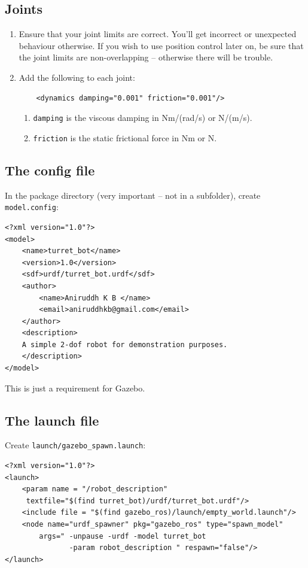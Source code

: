 \documentclass{article}
\begin{document}
        \subsection{Joints}
            \begin{enumerate}
                \item Ensure that your joint limits are correct. You'll get incorrect or unexpected behaviour otherwise. 
                If you wish to use position control later on, be sure that the joint limits are non-overlapping -- otherwise there 
                will be trouble.
                \item Add the following to each joint:
                \begin{verbatim}
    <dynamics damping="0.001" friction="0.001"/>
                \end{verbatim}
                \begin{enumerate}
                    \item \texttt{damping} is the viscous damping in Nm/(rad/s) or N/(m/s).
                    \item \texttt{friction} is the static frictional force in Nm or N.
                \end{enumerate}
            \end{enumerate}
        \newpage
        \subsection{The config file}
            In the package directory (very important -- not in a subfolder), create \texttt{model.config}:
            \begin{verbatim}
<?xml version="1.0"?>
<model>
    <name>turret_bot</name>
    <version>1.0</version>
    <sdf>urdf/turret_bot.urdf</sdf>
    <author>
        <name>Aniruddh K B </name>
        <email>aniruddhkb@gmail.com</email>
    </author>
    <description>
    A simple 2-dof robot for demonstration purposes.
    </description>
</model>          
            \end{verbatim}
            This is just a requirement for Gazebo.
        \subsection{The launch file}
            Create \texttt{launch/gazebo\_spawn.launch}:
            \begin{verbatim}
<?xml version="1.0"?>
<launch>
    <param name = "/robot_description" 
     textfile="$(find turret_bot)/urdf/turret_bot.urdf"/>
    <include file = "$(find gazebo_ros)/launch/empty_world.launch"/>
    <node name="urdf_spawner" pkg="gazebo_ros" type="spawn_model"
        args=" -unpause -urdf -model turret_bot 
               -param robot_description " respawn="false"/>
</launch>
            \end{verbatim}
\end{document}
